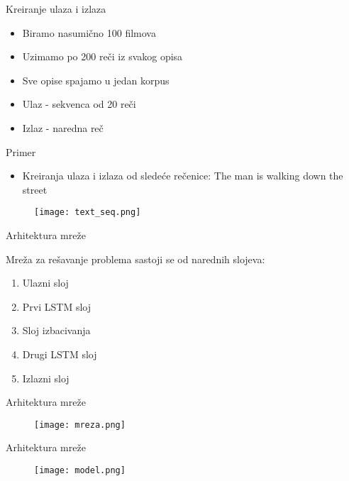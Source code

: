 \documentclass[table]{beamer}
\begin{document}
\begin{frame}{Kreiranje ulaza i izlaza}
\begin{itemize}
    \item Biramo nasumično {\color{blue}100} filmova
    \item Uzimamo po {\color{blue}200} reči iz svakog opisa
    \item Sve opise spajamo u jedan \alert{korpus}
    \item Ulaz - sekvenca od {\color{blue} 20} reči
    \item Izlaz - naredna reč
\end{itemize}
    
\end{frame}

\begin{frame}{Primer}

\begin{itemize}
    \item Kreiranja ulaza i izlaza od sledeće rečenice: The man is walking down the street
\end{itemize}
\begin{figure}
    \centering
    \texttt{[image: text\_seq.png]}
\end{figure}
\end{frame}

\begin{frame}{Arhitektura mreže}

Mreža za rešavanje problema sastoji se od narednih slojeva:
\begin{enumerate}
    \item Ulazni sloj 
    \item Prvi LSTM sloj
    \item Sloj izbacivanja 
    \item Drugi LSTM sloj
    \item Izlazni sloj
\end{enumerate}
    
\end{frame}

\begin{frame}{Arhitektura mreže}
\begin{figure}
    \centering
    \texttt{[image: mreza.png]}
\end{figure}
    
\end{frame}

\begin{frame}{Arhitektura mreže}
    \begin{figure}
        \centering
        \texttt{[image: model.png]}
    \end{figure}
\end{frame}
\end{document}
